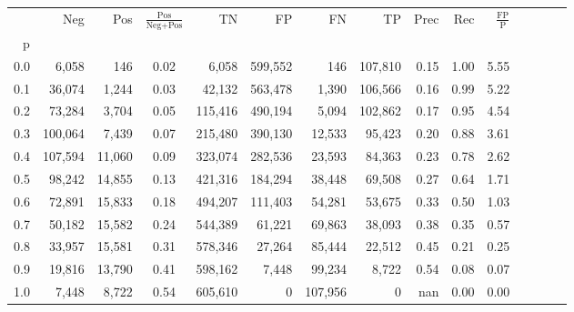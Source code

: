 \begin{tabular}{rrrcrrrrrrrrrrr}
\toprule
{} &      Neg &     Pos & $\frac{\text{Pos}}{\text{Neg}+\text{Pos}}$ &       TN &       FP &       FN &       TP &  Prec &   Rec & $\frac{\text{FP}}{\text{P}}$ \\
p   &          &         &                                            &          &          &          &          &       &       &                              \\
\midrule
0.0 &    6,058 &     146 &                                       0.02 &    6,058 &  599,552 &      146 &  107,810 &  0.15 &  1.00 &                         5.55 \\
0.1 &   36,074 &   1,244 &                                       0.03 &   42,132 &  563,478 &    1,390 &  106,566 &  0.16 &  0.99 &                         5.22 \\
0.2 &   73,284 &   3,704 &                                       0.05 &  115,416 &  490,194 &    5,094 &  102,862 &  0.17 &  0.95 &                         4.54 \\
0.3 &  100,064 &   7,439 &                                       0.07 &  215,480 &  390,130 &   12,533 &   95,423 &  0.20 &  0.88 &                         3.61 \\
0.4 &  107,594 &  11,060 &                                       0.09 &  323,074 &  282,536 &   23,593 &   84,363 &  0.23 &  0.78 &                         2.62 \\
0.5 &   98,242 &  14,855 &                                       0.13 &  421,316 &  184,294 &   38,448 &   69,508 &  0.27 &  0.64 &                         1.71 \\
0.6 &   72,891 &  15,833 &                                       0.18 &  494,207 &  111,403 &   54,281 &   53,675 &  0.33 &  0.50 &                         1.03 \\
0.7 &   50,182 &  15,582 &                                       0.24 &  544,389 &   61,221 &   69,863 &   38,093 &  0.38 &  0.35 &                         0.57 \\
0.8 &   33,957 &  15,581 &                                       0.31 &  578,346 &   27,264 &   85,444 &   22,512 &  0.45 &  0.21 &                         0.25 \\
0.9 &   19,816 &  13,790 &                                       0.41 &  598,162 &    7,448 &   99,234 &    8,722 &  0.54 &  0.08 &                         0.07 \\
1.0 &    7,448 &   8,722 &                                       0.54 &  605,610 &        0 &  107,956 &        0 &   nan &  0.00 &                         0.00 \\
\bottomrule
\end{tabular}

